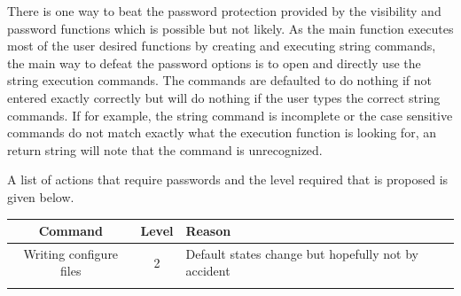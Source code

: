 There is one way to beat the password protection provided by the visibility and password functions which is possible but not likely. As the main function executes most of the user desired functions by creating and executing string commands, the main way to defeat the password options is to open and directly use the string execution commands. The commands are defaulted to do nothing if not entered exactly correctly but will do nothing if the user types the correct string commands. If for example, the string command is incomplete or the case sensitive commands do not match exactly what the execution function is looking for, an return string will note that the command is unrecognized. 

A list of actions that require passwords and the level required that is proposed is given below.

\begin{longtable}{ccl}
Command				& Level  	& Reason										\\
\hline
Writing configure files	& 2		& Default states change but hopefully not by accident	\\
\hline
\label{Tab:PasswordDetails}\end{longtable}

\newpage

